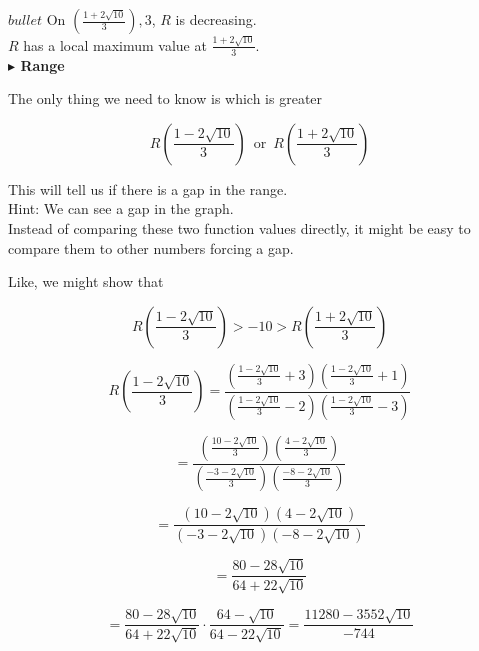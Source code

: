 \documentclass{ximera}
\begin{document}
\begin{example}
$bullet$ On $\left( \frac{1 + 2 \sqrt{10}}{3} \right), 3$, $R$ is decreasing. \\


$R$ has a local maximum value at $\frac{1 + 2 \sqrt{10}}{3}$.  \\


















\textbf{\textcolor{blue!55!black}{$\blacktriangleright$ Range}} 




The only thing we need to know is which is greater 

\[
R \left( \frac{1 - 2 \sqrt{10}}{3} \right) \, \text{ or } \, R \left( \frac{1 + 2 \sqrt{10}}{3} \right)
\]



This will tell us if there is a gap in the range. \\
Hint: We can see a gap in the graph. \\

Instead of comparing these two function values directly, it might be easy to compare them to other numbers forcing a gap.


Like, we might show that 


\[
R \left( \frac{1 - 2 \sqrt{10}}{3} \right) > -10 > R \left( \frac{1 + 2 \sqrt{10}}{3} \right)
\]


\[
R\left( \frac{1 - 2 \sqrt{10}}{3}   \right) = \frac{\left( \frac{1 - 2 \sqrt{10}}{3} + 3 \right) \left( \frac{1 - 2 \sqrt{10}}{3} + 1 \right)}{\left( \frac{1 - 2 \sqrt{10}}{3} - 2 \right)  \left( \frac{1 - 2 \sqrt{10}}{3} - 3 \right)}
\]




\[
= \frac{\left( \frac{10 - 2 \sqrt{10}}{3}  \right) \left( \frac{4 - 2 \sqrt{10}}{3} \right)}{\left( \frac{-3 - 2 \sqrt{10}}{3} \right)  \left( \frac{-8 - 2 \sqrt{10}}{3} \right)}
\]




\[
= \frac{ (10 - 2 \sqrt{10}) (4 - 2 \sqrt{10}) }{ (-3 - 2 \sqrt{10}) (-8 - 2 \sqrt{10}) }
\]



\[
= \frac{ 80 - 28 \sqrt{10} }{ 64 + 22\sqrt{10} }
\]




\[
= \frac{ 80 - 28 \sqrt{10} }{ 64 + 22\sqrt{10} } \cdot \frac{ 64 - \sqrt{10} }{ 64 - 22\sqrt{10} } = \frac{11280 - 3552 \sqrt{10}}{-744}
\]




\end{example}
\end{document}
